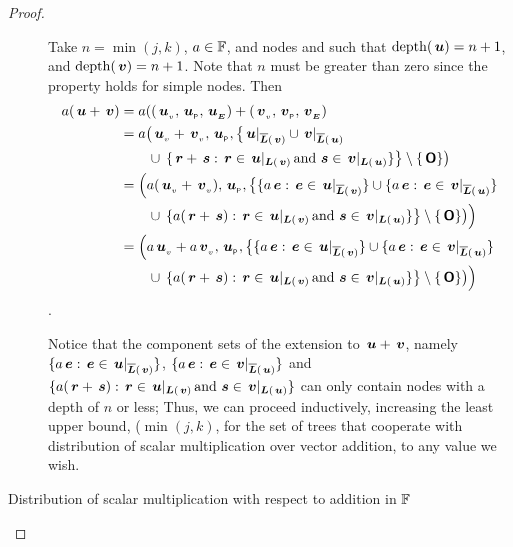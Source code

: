 \begin{proposition}
\begin{proof}
\begin{description}
      Take \(n = \min(j, k)\), \(a\in\FIELD\), and nodes  and  such that
      \(\depth(\node{u}) = n+1\), and \(\depth(\node{v}) = n+1\).
      Note that \(n\) must be greater than zero since the property holds for simple
      nodes.  Then
      \begin{align*}
        a(\node{u} + \node{v}) &= a (\Node{\nv{u}}{\nlabel{u}}{\extn{u}} + \Node{\nv{v}}{\nlabel{v}}{\extn{v}}\\ 
        &= a \bigl(\nv{u} + \nv{v}, \nlabel{u}, \bigl\{\nrestrictedto{u}{v} \cup \nrestrictedto{v}{u} \\
        &\qquad \cup \hspace{2pt} \{\node{r} + \node{s}:  \node{r} \in \restrictedto{u}{v}\mand \node{s} \in \restrictedto{v}{u} \} \bigr\} \setminus \{\zerotree\} \bigr) \\
        &= \Bigl(a (\nv{u} + \nv{v}), \nlabel{u}, 
        \bigl\{\{a \node{e}: \node{e} \in \nrestrictedto{u}{v}\} \cup \{a \node{e}: \node{e} \in \nrestrictedto{v}{u}\} \\
        &\qquad \cup \hspace{2pt} \{a (\node{r} + \node{s}):  \node{r} \in \restrictedto{u}{v}\mand \node{s} \in \restrictedto{v}{u} \} \bigr\} \setminus \{\zerotree\} \bigr)\Bigr) \\
        &= \Bigl(a \nv{u} + a \nv{v}, \nlabel{u},  
        \bigl\{\{a \node{e}: \node{e} \in \nrestrictedto{u}{v}\} \cup \{a \node{e}: \node{e} \in \nrestrictedto{v}{u}\} \\
        &\qquad \cup \hspace{2pt} \{a (\node{r} + \node{s}):  \node{r} \in \restrictedto{u}{v}\mand \node{s} \in \restrictedto{v}{u} \} \bigr\} \setminus \{\zerotree\} \bigr)\Bigr)
      \end{align*}.

      Notice that the component sets of the extension to \(\node{u} +
      \node{v}\), namely \(\{a \node{e}: \node{e} \in
      \nrestrictedto{u}{v}\}\),  
      \(\{a \node{e}: \node{e} \in
      \nrestrictedto{v}{u}\}\) and \(\{a (\node{r} + \node{s}):
      \node{r} \in \restrictedto{u}{v}\mand \node{s} \in
      \restrictedto{v}{u} \}\) can only contain nodes with a depth of
      \(n\) or less; Thus, we can proceed inductively, increasing
      the least upper bound, (\(\min(j, k)\), for the set of trees
      that cooperate with distribution of scalar multiplication over
      vector addition, to any value we wish.

    \item[Distribution of scalar multiplication with respect to
      addition in $\FIELD$ ]


\end{description}
\end{proof}
\end{proposition}
